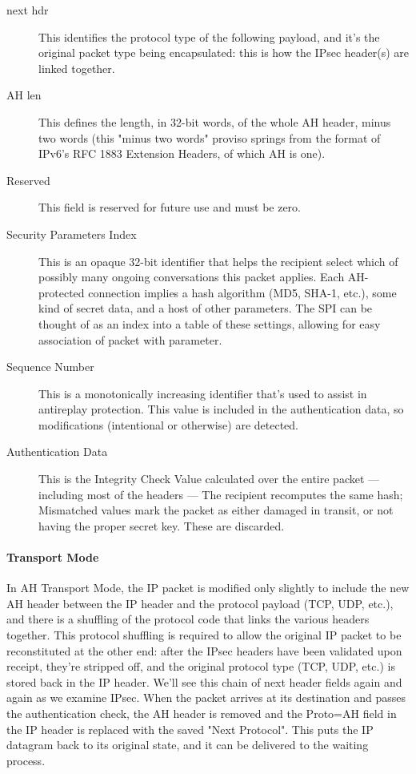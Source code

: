 \documentclass[12pt]{article}
\begin{document}
\begin{description}
\item[next hdr]
This identifies the protocol type of the following payload, and it's the original packet type being encapsulated: this is how the IPsec header(s) are linked together.
\item[AH len]
This defines the length, in 32-bit words, of the whole AH header, minus two words (this "minus two words" proviso springs from the format of IPv6's RFC 1883 Extension Headers, of which AH is one).
\item[Reserved]
This field is reserved for future use and must be zero.
\item[Security Parameters Index]
This is an opaque 32-bit identifier that helps the recipient select which of possibly many ongoing conversations this packet applies. Each AH-protected connection implies a hash algorithm (MD5, SHA-1, etc.), some kind of secret data, and a host of other parameters. The SPI can be thought of as an index into a table of these settings, allowing for easy association of packet with parameter.
\item[Sequence Number]
This is a monotonically increasing identifier that's used to assist in antireplay protection. This value is included in the authentication data, so modifications (intentional or otherwise) are detected.
\item[Authentication Data]
This is the Integrity Check Value calculated over the entire packet — including most of the headers — The recipient recomputes the same hash; Mismatched values mark the packet as either damaged in transit, or not having the proper secret key. These are discarded.
\end{description}

\paragraph{Transport Mode}
In AH Transport Mode, the IP packet is modified only slightly to include the new AH header between the IP header and the protocol payload (TCP, UDP, etc.), and there is a shuffling of the protocol code that links the various headers together.
This protocol shuffling is required to allow the original IP packet to be reconstituted at the other end: after the IPsec headers have been validated upon receipt, they're stripped off, and the original protocol type (TCP, UDP, etc.) is stored back in the IP header. We'll see this chain of next header fields again and again as we examine IPsec.
When the packet arrives at its destination and passes the authentication check, the AH header is removed and the Proto=AH field in the IP header is replaced with the saved "Next Protocol". This puts the IP datagram back to its original state, and it can be delivered to the waiting process.
\end{document}

